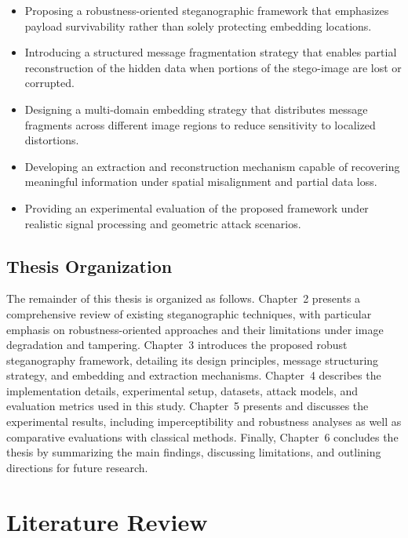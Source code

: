\documentclass[12pt,a4paper,oneside]{report}
\begin{document}
	\begin{itemize}
		\item Proposing a robustness-oriented steganographic framework that emphasizes payload survivability rather than solely protecting embedding locations.
		
		\item Introducing a structured message fragmentation strategy that enables partial reconstruction of the hidden data when portions of the stego-image are lost or corrupted.
		
		\item Designing a multi-domain embedding strategy that distributes message fragments across different image regions to reduce sensitivity to localized distortions.
		
		\item Developing an extraction and reconstruction mechanism capable of recovering meaningful information under spatial misalignment and partial data loss.
		
		\item Providing an experimental evaluation of the proposed framework under realistic signal processing and geometric attack scenarios.
	\end{itemize}
	
	
	\section{Thesis Organization}
	
	The remainder of this thesis is organized as follows. Chapter~2 presents a comprehensive review of existing steganographic techniques, with particular emphasis on robustness-oriented approaches and their limitations under image degradation and tampering. Chapter~3 introduces the proposed robust steganography framework, detailing its design principles, message structuring strategy, and embedding and extraction mechanisms. Chapter~4 describes the implementation details, experimental setup, datasets, attack models, and evaluation metrics used in this study. Chapter~5 presents and discusses the experimental results, including imperceptibility and robustness analyses as well as comparative evaluations with classical methods. Finally, Chapter~6 concludes the thesis by summarizing the main findings, discussing limitations, and outlining directions for future research.
	
	
	\chapter{Literature Review}
	
\end{document}
